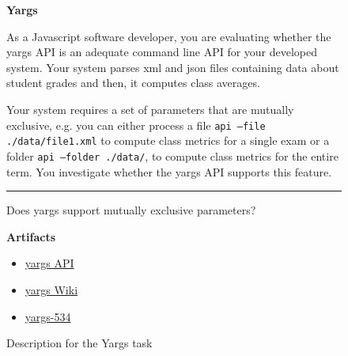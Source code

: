 \begin{figure}[!htb]
\begin{mdframed}[backgroundcolor=gray!05] 
\begin{scriptsize}

{\large \textbf{Yargs}} \bigskip





As a Javascript software developer, you are evaluating whether the   yargs  API is an adequate command
line API for your developed system. Your system parses xml and json files containing data about student
grades and then, it computes class averages. \medskip

Your system requires a set of parameters that are mutually
exclusive, e.g. you can either process a file  \texttt{api --file ./data/file1.xml}   to compute class metrics for a
single exam or a folder \texttt{api --folder ./data/}, to compute class metrics for the entire term. You
investigate whether the yargs API supports this feature.


\begin{center}
\rule{10cm}{0.4pt}
\end{center}

Does yargs support mutually exclusive parameters?

\medskip

\textbf{Artifacts}

\begin{itemize}
    \item \href{https://github.com/yargs/yargs/blob/master/docs/api.md}{yargs API}
    \item \href{https://github.com/yargs/yargs/wiki}{yargs Wiki}
    \item \href{https://github.com/yargs/yargs/issues/534}{yargs-534}
\end{itemize}

\end{scriptsize}
\end{mdframed}
\caption{Description for the Yargs task}
\end{figure}

    
